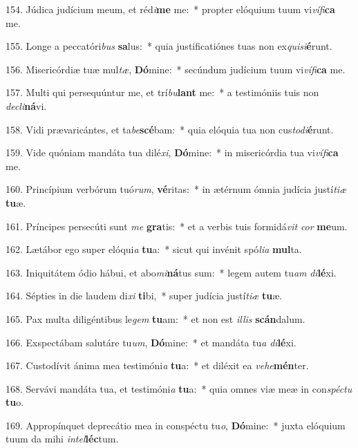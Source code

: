 154. Júdica judícium meum, et réd\textit{i}\textbf{me} me:~*  propter elóquium tuum vi\textit{ví}\textit{fi}\textbf{ca} me.\

155. Longe a peccatóri\textit{bus} \textbf{sa}lus:~*  quia justificatiónes tuas non ex\textit{qui}\textit{si}\textbf{é}runt.\

156. Misericórdiæ tuæ mul\textit{tæ}, \textbf{Dó}mine:~*  secúndum judícium tuum vi\textit{ví}\textit{fi}\textbf{ca} me.\

157. Multi qui persequúntur me, et trí\textit{bu}\textbf{lant} me:~*  a testimóniis tuis non \textit{de}\textit{cli}\textbf{ná}vi.\

158. Vidi prævaricántes, et ta\textit{be}\textbf{scé}bam:~*  quia elóquia tua non cus\textit{to}\textit{di}\textbf{é}runt.\

159. Vide quóniam mandáta tua dilé\textit{xi}, \textbf{Dó}mine:~*  in misericórdia tua vi\textit{ví}\textit{fi}\textbf{ca} me.\

160. Princípium verbórum tuó\textit{rum}, \textbf{vé}ritas:~*  in ætérnum ómnia judícia justí\textit{ti}\textit{æ} \textbf{tu}æ.\

161. Príncipes persecúti sunt \textit{me} \textbf{gra}tis:~*  et a verbis tuis formidá\textit{vit} \textit{cor} \textbf{me}um.\

162. Lætábor ego super elóqui\textit{a} \textbf{tu}a:~*  sicut qui invénit spó\textit{li}\textit{a} \textbf{mul}ta.\

163. Iniquitátem ódio hábui, et abo\textit{mi}\textbf{ná}tus sum:~*  legem autem tu\textit{am} \textit{di}\textbf{lé}xi.\

164. Sépties in die laudem di\textit{xi} \textbf{ti}bi,~*  super judícia justí\textit{ti}\textit{æ} \textbf{tu}æ.\

165. Pax multa diligéntibus le\textit{gem} \textbf{tu}am:~*  et non est \textit{il}\textit{lis} \textbf{scán}dalum.\

166. Exspectábam salutáre tu\textit{um}, \textbf{Dó}mine:~*  et mandáta tu\textit{a} \textit{di}\textbf{lé}xi.\

167. Custodívit ánima mea testimóni\textit{a} \textbf{tu}a:~*  et diléxit ea \textit{ve}\textit{he}\textbf{mén}ter.\

168. Servávi mandáta tua, et testimóni\textit{a} \textbf{tu}a:~*  quia omnes viæ meæ in con\textit{spéc}\textit{tu} \textbf{tu}o.\

169. Appropínquet deprecátio mea in conspéctu tu\textit{o}, \textbf{Dó}mine:~*  juxta elóquium tuum da mihi \textit{in}\textit{tel}\textbf{léc}tum.\

